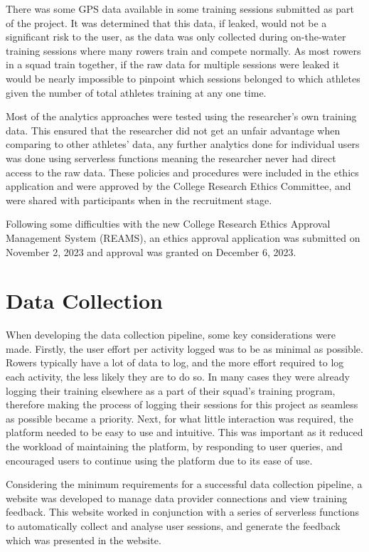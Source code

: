 There was some GPS data available in some training sessions submitted as part of the project. It was determined that this data, if leaked, would not be a significant risk to the user, as the data was only collected during on-the-water training sessions where many rowers train and compete normally. As most rowers in a squad train together, if the raw data for multiple sessions were leaked it would be nearly impossible to pinpoint which sessions belonged to which athletes given the number of total athletes training at any one time. 

Most of the analytics approaches were tested using the researcher's own training data. This ensured that the researcher did not get an unfair advantage when comparing to other athletes' data, any further analytics done for individual users was done using serverless functions meaning the researcher never had direct access to the raw data. These policies and procedures were included in the ethics application and were approved by the College Research Ethics Committee, and were shared with participants when in the recruitment stage. 

Following some difficulties with the new College Research Ethics Approval Management System (REAMS), an ethics approval application was submitted on November 2, 2023 and approval was granted on December 6, 2023.

\section{Data Collection}
When developing the data collection pipeline, some key considerations were made. Firstly, the user effort per activity logged was to be as minimal as possible. Rowers typically have a lot of data to log, and the more effort required to log each activity, the less likely they are to do so. In many cases they were already logging their training elsewhere as a part of their squad's training program, therefore making the process of logging their sessions for this project as seamless as possible became a priority. Next, for what little interaction was required, the platform needed to be easy to use and intuitive. This was important as it reduced the workload of maintaining the platform, by responding to user queries, and encouraged users to continue using the platform due to its ease of use.

Considering the minimum requirements for a successful data collection pipeline, a website was developed to manage data provider connections and view training feedback. This website worked in conjunction with a series of serverless functions to automatically collect and analyse user sessions, and generate the feedback which was presented in the website.

